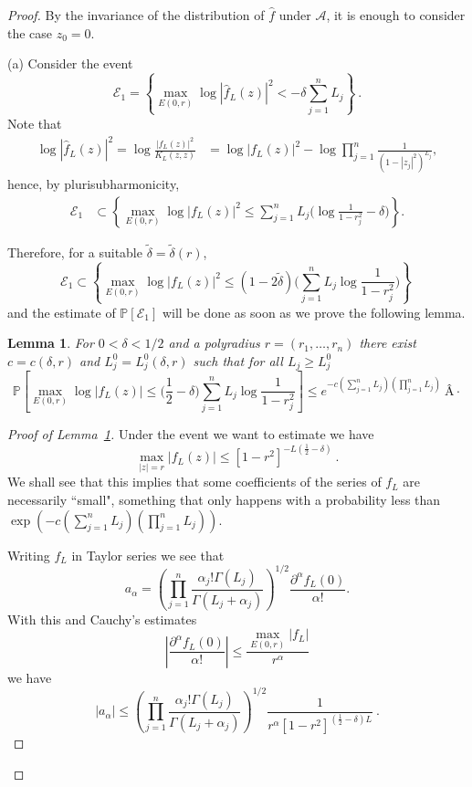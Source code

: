 \documentclass[12pt,twoside,final,amsfonts]{amsart}
\theoremstyle{plain}
\newtheorem{lemma}[theorem]{Lemma}
\theoremstyle{definition}
\theoremstyle{definition}
\begin{document}
\begin{proof} By the invariance of the distribution of $\hat f$ under $\mathcal A$, it is enough to consider the case $z_0=0$.

(a) Consider the event
 \[
  \mathcal E_1=\left\{ \max_{E(0,r)}\log|\hat f_L(z)|^2<-\delta {\sum_{j=1}^n L_j} \right\}\ .
 \]
Note that
\begin{align*}
\log |\hat f_L(z)|^2=\log\frac{|f_L(z)|^2}{K_L(z,z)}& =\log|f_L(z)|^2-\log \prod_{j=1}^n \frac{1}{(1-|z_j|^2)^{L_j}},
\end{align*}
hence, by plurisubharmonicity,
\begin{align*}
\mathcal E_1& \subset \left\{ \max_{E(0,r)} \log |f_L(z)|^2 \leq {\sum_{j=1}^n L_j} \bigl(\log\frac{1}{1-r_j^2}- \delta\bigr)  \right\}.
\end{align*}

Therefore, for a suitable $\tilde\delta=\tilde\delta(r)$,
\[
 \mathcal E_1 \subset \left\{ \max_{E(0,r)} \log |f_L(z)|^2 \leq (1-2\tilde\delta) \bigl({\sum_{j=1}^n L_j} \log\frac{1}{1-r_j^2}\bigr)\right\}\ 
\]
and the estimate of $\mathbb P[\mathcal E_1]$ will be done as soon as we prove the following lemma.

\begin{lemma}\label{maxlogfL}
For $0<\delta<1/2$ and a polyradius $r=(r_1,\dots,r_n)$ there exist $c=c(\delta,r)$ and $L_j^0=L_j^0(\delta,r)$ such that for all $L_j\geq L_j^0$
\[
\mathbb P\left[\max_{E(0,r)} \log|f_L(z)| \leq \bigl(\frac{1}{2}-\delta\bigr){\sum_{j=1}^n L_j} \log\frac{1}{1-r_j^2} \right]\leq e^{-c{(\sum_{j=1}^n L_j)(\prod_{j=1}^n L_j)}}\ Â·
\]
\end{lemma}

\begin{proof} [Proof of Lemma~\ref{maxlogfL}]
Under the event we want to estimate we have
\[
\max_{|z|=r}|f_L(z)|\leq [1-r^2]^{-L\left(\frac{1}{2}-\delta\right)}\ .
\]
We shall see that this implies that some coefficients of the series of $f_L$ are necessarily ``small", something that only happens with a probability less than $\exp(-c{(\sum_{j=1}^n L_j)(\prod_{j=1}^n L_j)})$. 

Writing $f_L$ in Taylor series we see that
\[
a_{\alpha}=\left(\prod_{j=1}^n \frac{\alpha_j!\Gamma(L_j)}{\Gamma(L_j+\alpha_j)}\right)^{1/2}\frac{\partial^{\alpha}f_L(0)}{\alpha!}.
\]
With this and Cauchy's estimates
\[
\left| \frac{\partial^{\alpha}f_L(0)}{\alpha!}\right|\leq \frac{\max\limits_{E(0,r)} |f_L|}{r^\alpha}
\]
we have
\begin{equation*}\label{coeff}
|a_{\alpha}|\leq \left(\prod_{j=1}^n \frac{\alpha_j!\Gamma(L_j)}{\Gamma(L_j+\alpha_j)}\right)^{1/2}
\frac 1{r^\alpha [1-r^2]^{(\frac 12-\delta)L}} \ .
\end{equation*}


\end{proof}
\end{proof}
\end{document}
